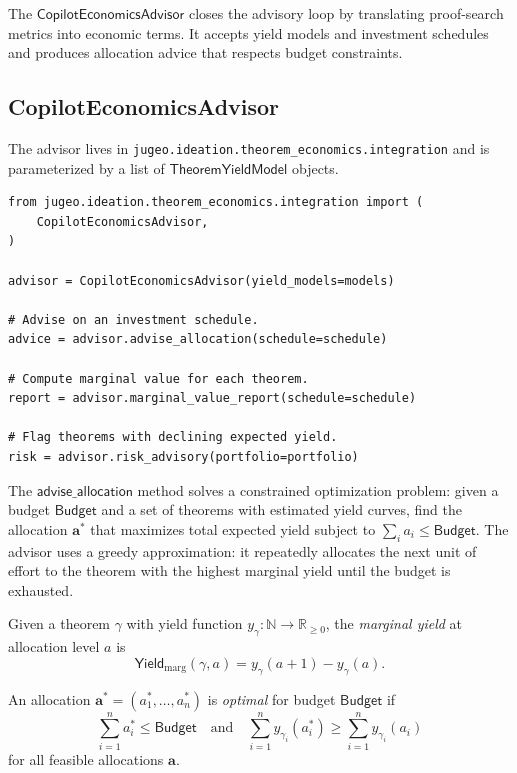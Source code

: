 \documentclass[11pt]{article}
\newcommand{\Budget}{\mathsf{Budget}}
\newcommand{\Yield}{\mathsf{Yield}}
\begin{document}
The $\mathsf{CopilotEconomicsAdvisor}$ closes the advisory loop
by translating proof-search metrics into economic terms.  It
accepts yield models and investment schedules and produces
allocation advice that respects budget constraints.

\subsection{CopilotEconomicsAdvisor}\label{sec:econ-advisor}

The advisor lives in
\texttt{jugeo.ideation.theorem\_economics.integration} and is
parameterized by a list of $\mathsf{TheoremYieldModel}$ objects.

\begin{lstlisting}[style=jugeo-python,caption={CopilotEconomicsAdvisor core interface.},label={lst:econ-advisor}]
from jugeo.ideation.theorem_economics.integration import (
    CopilotEconomicsAdvisor,
)

advisor = CopilotEconomicsAdvisor(yield_models=models)

# Advise on an investment schedule.
advice = advisor.advise_allocation(schedule=schedule)

# Compute marginal value for each theorem.
report = advisor.marginal_value_report(schedule=schedule)

# Flag theorems with declining expected yield.
risk = advisor.risk_advisory(portfolio=portfolio)
\end{lstlisting}

The $\mathsf{advise\_allocation}$ method solves a constrained
optimization problem: given a budget $\Budget$ and a set of
theorems with estimated yield curves, find the allocation
$\mathbf{a}^*$ that maximizes total expected yield subject to
$\sum_i a_i \leq \Budget$.  The advisor uses a greedy
approximation: it repeatedly allocates the next unit of effort
to the theorem with the highest marginal yield until the budget
is exhausted.

\begin{definition}\label{def:marginal-yield}
Given a theorem $\gamma$ with yield function $y_\gamma : \mathbb{N}
\to \mathbb{R}_{\geq 0}$, the \emph{marginal yield} at
allocation level $a$ is
\[
  \Yield_{\mathrm{marg}}(\gamma, a) = y_\gamma(a+1) - y_\gamma(a).
\]
\end{definition}

\begin{definition}\label{def:optimal-alloc}
An allocation $\mathbf{a}^* = (a_1^*, \ldots, a_n^*)$ is
\emph{optimal} for budget $\Budget$ if
\[
  \sum_{i=1}^{n} a_i^* \leq \Budget
  \quad\text{and}\quad
  \sum_{i=1}^{n} y_{\gamma_i}(a_i^*)
  \geq
  \sum_{i=1}^{n} y_{\gamma_i}(a_i)
\]
for all feasible allocations $\mathbf{a}$.
\end{definition}
\end{document}
